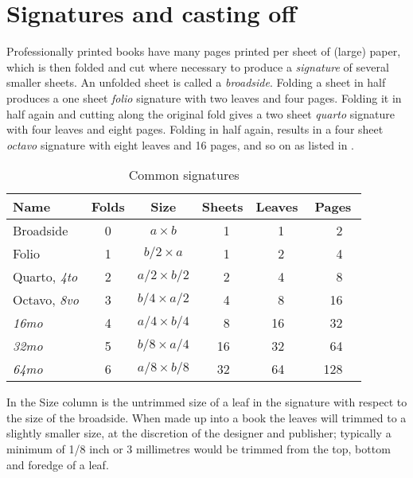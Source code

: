 \documentclass[10pt,letterpaper]{memoir}
\begin{document}
\section{Signatures and casting off}

    Professionally printed books have many pages printed per sheet of (large)
paper, which is then folded and cut where necessary to produce a 
\emph{signature} of several smaller sheets. An 
unfolded sheet is called a \emph{broadside}. 
Folding a sheet in half produces a one sheet 
\emph{folio} signature with two leaves and four pages. 
Folding it in half again and cutting along the original fold gives a 
two sheet \emph{quarto} signature with four leaves
and eight pages. 
Folding in half again, 
results in a four sheet \emph{octavo} signature with eight
leaves and 16 pages, and so on as listed in .

\begin{table}
\centering
\caption{Common signatures} \label{tab:signatures}
\begin{tabular}{lcccrccrccrc} \hline
Name      & Folds & Size             & \multicolumn{3}{c}{Sheets} & 
\multicolumn{3}{c}{Leaves} & \multicolumn{3}{c}{Pages} \\ \hline
Broadside & 0     & $a \times b$     & &  1 & & &  1 & & &   2 & \\
Folio     & 1     & $b/2 \times a$   & &  1 & & &  2 & & &   4 & \\
Quarto, \emph{4to} & 2 & $a/2 \times b/2$ & & 2 & & & 4 & & & 8 & \\
Octavo, \emph{8vo} & 3 & $b/4 \times a/2$ & & 4 & & & 8 & & & 16 & \\
\emph{16mo} & 4   & $a/4 \times b/4$ & &  8 & & & 16 & & &  32 & \\
\emph{32mo} & 5   & $b/8 \times a/4$ & & 16 & & & 32 & & &  64 & \\
\emph{64mo} & 6   & $a/8 \times b/8$ & & 32 & & & 64 & & & 128 & \\ \hline
\end{tabular}%
%
%
\end{table}

    In  the Size column is the untrimmed size of a 
leaf in 
the signature
with respect to the size of the broadside. When made up into a book the
leaves will trimmed to a slightly smaller size, at the discretion of the
designer and publisher; typically a minimum of 1/8 inch or 3 millimetres
would be trimmed from the top, bottom and foredge of a leaf.
\end{document}
